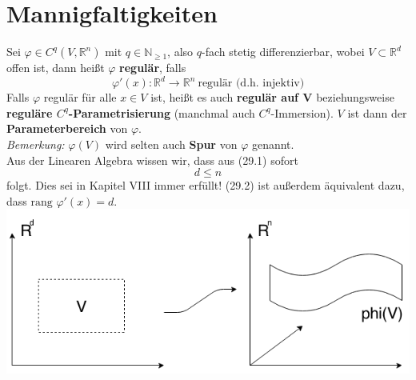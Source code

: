 \documentclass[a4paper,12pt,portrait]{book}
\newcommand{\rang}{\text{rang\ }}
\theoremstyle{theoremstyle}
\begin{document}
\section{Mannigfaltigkeiten}
Sei $\varphi\in C^q(V,\mathbb{R}^n)$ mit $q\in\mathbb{N}_{\geq 1}$, also 
$q$-fach stetig differenzierbar, wobei $V\subset\mathbb{R}^d$ offen ist, 
dann heißt $\varphi$ \textbf{regulär}, falls
    \begin{equation}
    \varphi'(x):\mathbb{R}^d\rightarrow\mathbb{R}^n \ \text{regulär (d.h. injektiv)}
    \end{equation}
Falls $\varphi$ regulär für alle $x\in V$ ist, heißt es auch 
\textbf{regulär auf V} beziehungsweise \textbf{reguläre $C^q$-Parametrisierung} 
(manchmal auch $C^q$-Immersion). $V$ ist dann der \textbf{Parameterbereich} von $\varphi$.\\
\emph{Bemerkung:} $\varphi(V)$ wird selten auch \textbf{Spur} von $\varphi$ genannt.\\
\linebreak
\linebreak
Aus der Linearen Algebra wissen wir, dass aus (29.1) sofort 
    \begin{equation}
    d\leq n
    \end{equation}
folgt. Dies sei in Kapitel VIII immer erfüllt! (29.2) ist außerdem äquivalent dazu, dass $\rang \varphi'(x)=d$.\\
    \includegraphics[scale=0.5]{pictures/MA2_0001}
\end{document}
